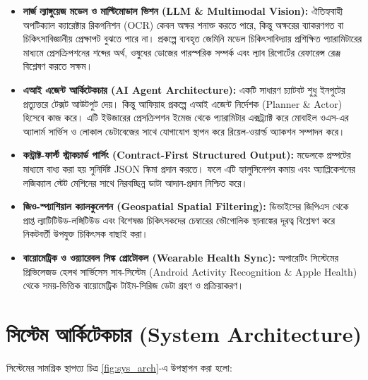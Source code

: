 \documentclass[12pt,a4paper,oneside]{report}
\begin{document}
\begin{itemize}
    \item \textbf{লার্জ ল্যাঙ্গুয়েজ মডেল ও মাল্টিমোডাল ভিশন (LLM \& Multimodal Vision):} ঐতিহ্যবাহী অপটিক্যাল ক্যারেক্টার রিকগনিশন (OCR) কেবল অক্ষর শনাক্ত করতে পারে, কিন্তু অক্ষরের ব্যাকরণগত বা চিকিৎসাবিজ্ঞানীয় প্রেক্ষাপট বুঝতে পারে না। প্রকল্পে ব্যবহৃত জেমিনি মডেল চিকিৎসাবিদ্যায় প্রশিক্ষিত প্যারামিটারের মাধ্যমে প্রেসক্রিপশনের শব্দের অর্থ, ওষুধের ডোজের পারস্পরিক সম্পর্ক এবং ল্যাব রিপোর্টের রেফারেন্স রেঞ্জ বিশ্লেষণ করতে সক্ষম।
    \item \textbf{এআই এজেন্ট আর্কিটেকচার (AI Agent Architecture):} একটি সাধারণ চ্যাটবট শুধু ইনপুটের প্রত্যুত্তরে টেক্সট আউটপুট দেয়। কিন্তু আফিয়াহ প্রকল্পে এআই এজেন্ট নির্দেশক (Planner \& Actor) হিসেবে কাজ করে। এটি ইউজারের প্রেসক্রিপশন ইমেজ থেকে প্যারামিটার এক্সট্র্যাক্ট করে মোবাইল ওএস-এর অ্যালার্ম সার্ভিস ও লোকাল ডেটাবেজের সাথে যোগাযোগ স্থাপন করে রিয়েল-ওয়ার্ল্ড অ্যাকশন সম্পাদন করে।
    \item \textbf{কন্ট্রাক্ট-ফার্স্ট স্ট্রাকচার্ড পার্সিং (Contract-First Structured Output):} মডেলকে প্রম্পটের মাধ্যমে বাধ্য করা হয় সুনির্দিষ্ট JSON স্কিমা প্রদান করতে। ফলে এটি হ্যালুসিনেশন কমায় এবং অ্যাপ্লিকেশনের লজিক্যাল স্টেট মেশিনের সাথে নিরবচ্ছিন্ন ডাটা আদান-প্রদান নিশ্চিত করে।
    \item \textbf{জিও-স্প্যাশিয়াল ক্যালকুলেশন (Geospatial Spatial Filtering):} ডিভাইসের জিপিএস থেকে প্রাপ্ত ল্যাটিটিউড-লঙ্গিটিউড এবং বিশেষজ্ঞ চিকিৎসকদের চেম্বারের ভৌগোলিক স্থানাঙ্কের দূরত্ব বিশ্লেষণ করে নিকটবর্তী উপযুক্ত চিকিৎসক বাছাই করা।
    \item \textbf{বায়োমেট্রিক ও ওয়্যারেবল সিঙ্ক প্রোটোকল (Wearable Health Sync):} অপারেটিং সিস্টেমের প্রিভিলেজড হেলথ সার্ভিসেস সাব-সিস্টেম (Android Activity Recognition \& Apple Health) থেকে সময়-ভিত্তিক বায়োমেট্রিক টাইম-সিরিজ ডেটা গ্রহণ ও প্রক্রিয়াকরণ।
\end{itemize}

\chapter{সিস্টেম আর্কিটেকচার (System Architecture)}

সিস্টেমের সামগ্রিক স্থাপত্য চিত্র \ref{fig:sys_arch}-এ উপস্থাপন করা হলো:
\end{document}
